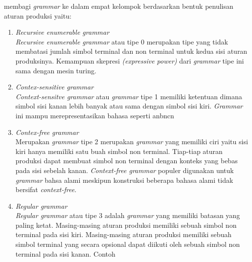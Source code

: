 \citet{bar_feigenbaum} membagi \emph{grammar} ke dalam empat kelompok berdasarkan bentuk penulisan aturan produksi yaitu:
\begin{enumerate}
	\item \emph{Recursive enumerable grammar}\\
	\emph{Recursive enumerable grammar} atau tipe 0 merupakan tipe yang tidak membatasi jumlah simbol terminal dan non terminal untuk kedua sisi aturan produksinya. Kemampuan skepresi \emph{(expressive power)} dari \emph{grammar} tipe ini sama dengan mesin turing.
	\item \emph{Contex-sensitive grammar}\\
	\emph{Context-sensitve grammar} atau \emph{grammar} tipe 1 memiliki ketentuan dimana simbol sisi kanan lebih banyak atau sama dengan simbol sisi kiri. \emph{Grammar} ini mampu merepresentasikan bahasa seperti anbncn
	\item \emph{Contex-free grammar}\\
	Merupakan \emph{grammar} tipe 2 merupakan \emph{grammar} yang memiliki ciri yaitu sisi kiri hanya memiliki satu buah simbol non terminal. Tiap-tiap aturan produksi dapat membuat simbol non terminal dengan konteks yang bebas pada sisi sebelah kanan. \emph{Context-free grammar} populer digunakan untuk \emph{grammar} bahsa alami meskipun konstruksi beberapa bahasa alami tidak bersifat \emph{context-free}.
	\item \emph{Regular grammar}\\
	\emph{Regular grammar} atau tipe 3 adalah \emph{grammar} yang memiliki batasan yang paling ketat. Masing-masing aturan produksi memiliki sebuah simbol non terminal pada sisi kiri. Masing-masing aturan produksi memiliki sebuah simbol terminal yang secara opsional dapat diikuti oleh sebuah simbol non terminal pada sisi kanan. Contoh 
\end{enumerate}